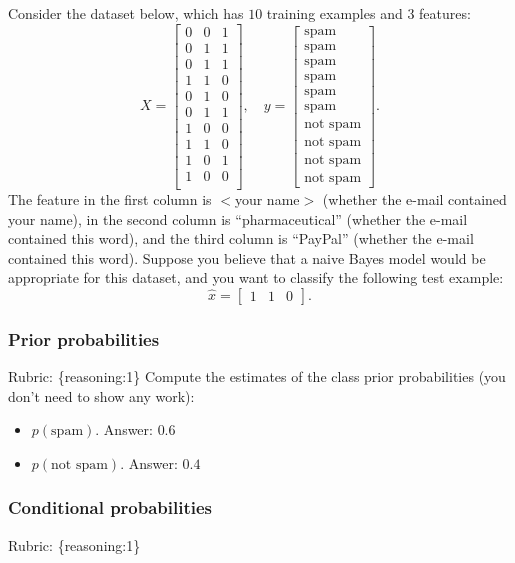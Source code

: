\documentclass{article}
\def\rubric#1{\gre{Rubric: \{#1\}}}{}
\def\blu#1{{\color{blu}#1}}
\def\gre#1{{\color{gre}#1}}
\def\items#1{\begin{itemize}#1\end{itemize}}
\def\ans#1{\gre{Answer: #1}}{}
\begin{document}
Consider the dataset below, which has $10$ training examples and $3$ features:
\[
X = \begin{bmatrix}0 & 0 & 1\\0 & 1 & 1\\ 0 & 1 & 1\\ 1 & 1 & 0\\0 & 1 & 0\\0 & 1 & 1\\1 & 0 & 0\\1 & 1 & 0\\1 & 0 & 1\\1 & 0 & 0\\\end{bmatrix}, \quad y = \begin{bmatrix}\text{spam}\\\text{spam}\\\text{spam}\\\text{spam}\\\text{spam}\\\text{spam}\\\text{not spam}\\\text{not spam}\\\text{not spam}\\\text{not spam}\end{bmatrix}.
\]
The feature in the first column is $<$your name$>$ (whether the e-mail contained your name), in the second column is ``pharmaceutical'' (whether the e-mail contained this word), and the third column is ``PayPal'' (whether the e-mail contained this word).
Suppose you believe that a naive Bayes model would be appropriate for this dataset, and you want to classify the following test example:
\[
\hat{x} = \begin{bmatrix}1 & 1 & 0\end{bmatrix}.
\]

\subsubsection{Prior probabilities}
\rubric{reasoning:1}
\blu{Compute the estimates of the class prior probabilities} (you don't need to show any work):
\items{
\item$ p(\text{spam})$. \ans{$0.6$}
\item $p(\text{not spam})$. \ans{$0.4$}
}

\subsubsection{Conditional probabilities}
\rubric{reasoning:1}
\end{document}
